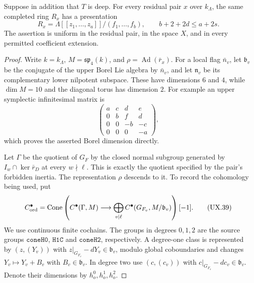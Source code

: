 \begin{proposition}
Suppose in addition that $T$ is deep.  For every residual
pair $x$ over $k_\Lambda$, the same completed ring $R_x$
has a presentation
\[
 R_x=\Lambda[[z_1,\ldots,z_a]]/(f_1,\ldots,f_b),
 \qquad b+2+2d\le a+2s .
 \tag{UX.37}
\]
The assertion is uniform in the residual pair, in the
space $X$, and in every permitted coefficient extension.
\end{proposition}

\begin{proof}
Write $k=k_\Lambda$, $M=\mathfrak{sp}_4(k)$, and
$\rho=\operatorname{Ad}(\bar r_x)$.  For a local
flag $\bar n_v$, let $\mathfrak b_v$ be the conjugate
of the upper Borel Lie algebra by $\bar n_v$, and
let $\mathfrak n_v$ be its complementary lower
nilpotent subspace.  These have dimensions $6$ and
$4$, while $\dim M=10$ and the diagonal torus
has dimension $2$.  For example an upper
symplectic infinitesimal matrix is
\[
 \begin{pmatrix}
 a&c&d&e\\0&b&f&d\\0&0&-b&-c\\0&0&0&-a
 \end{pmatrix},
 \tag{UX.38}
\]
which proves the asserted Borel dimension directly.

Let $\Gamma$ be the quotient of $G_F$ by the
closed normal subgroup generated by
$I_w\cap\ker\bar r_D$ at every $w\nmid\ell$.
This is exactly the quotient specified by the
pair's forbidden inertia.  The representation
$\rho$ descends to it.  To record the cohomology
being used, put
\[
 C^\bullet_{\rm ord}
 =\operatorname{Cone}\left(
 C^\bullet(\Gamma,M)\longrightarrow
       \bigoplus_{v\mid\ell}
           C^\bullet(G_{F_v},M/\mathfrak b_v)
                  \right)[-1].
 \tag{UX.39}
\]
We use continuous finite cochains.  The groups in
degrees $0,1,2$ are the source groups
$\mathtt{coneH0}$, $\mathtt{H1C}$ and $\mathtt{coneH2}$,
respectively.  A degree-one class is represented by $(z,(Y_v))$
with $z|_{G_{F_v}}-dY_v\in\mathfrak b_v$,
modulo global coboundaries and changes
$Y_v\mapsto Y_v+B_v$ with $B_v\in\mathfrak b_v$.
In degree two use $(c,(c_v))$ with
$c|_{G_{F_v}}-dc_v\in\mathfrak b_v$.
Denote their dimensions by $h^0_o,h^1_o,h^2_o$.


\end{proof}
